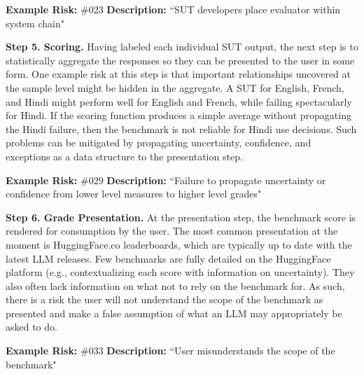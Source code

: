 \documentclass{article}
\begin{document}
\begin{center}
    \begin{tcolorbox}[colback=gray!10, colframe=black!50, width=\textwidth, boxrule=0.5mm, sharp corners, coltext=black]
        {\bf Example Risk:} \#023
        \newline
        {\bf Description:} ``SUT developers place evaluator within system chain"
    \end{tcolorbox}
\end{center}

{\bf Step 5. Scoring.} Having labeled each individual SUT output, the next step is to statistically aggregate the responses so they can be presented to the user in some form. One example risk at this step is that important relationships uncovered at the sample level might be hidden in the aggregate. A SUT for English, French, and Hindi might perform well for English and French, while failing spectacularly for Hindi. If the scoring function produces a simple average without propagating the Hindi failure, then the benchmark is not reliable for Hindi use decisions. Such problems can be mitigated by propagating uncertainty, confidence, and exceptions as a data structure to the presentation step.

\begin{center}
    \begin{tcolorbox}[colback=gray!10, colframe=black!50, width=\textwidth, boxrule=0.5mm, sharp corners, coltext=black]
        {\bf Example Risk:} \#029
        \newline
        {\bf Description:} ``Failure to propagate uncertainty or confidence from lower level measures to higher level grades"
    \end{tcolorbox}
\end{center}

{\bf Step 6. Grade Presentation.} At the presentation step, the benchmark score is rendered for consumption by the user. The most common presentation at the moment is HuggingFace.co leaderboards, which are typically up to date with the latest LLM releases. Few benchmarks are fully detailed on the HuggingFace platform (e.g., contextualizing each score with information on uncertainty). They also often lack information on what not to rely on the benchmark for. As such, there is a risk the user will not understand the scope of the benchmark as presented and make a false assumption of what an LLM may appropriately be asked to do.

\begin{center}
    \begin{tcolorbox}[colback=gray!10, colframe=black!50, width=\textwidth, boxrule=0.5mm, sharp corners, coltext=black]
        {\bf Example Risk:} \#033
        \newline
        {\bf Description:} ``User misunderstands the scope of the benchmark"
    \end{tcolorbox}
\end{center}
\end{document}
